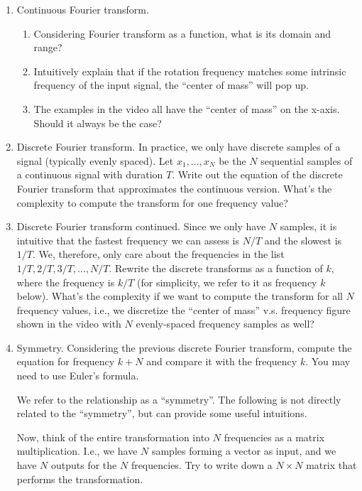 \documentclass[letterpaper, 11pt]{article}
\newcommand{\1}{\mathds{1}}	%
\theoremstyle{definition}
\begin{document}
\begin{enumerate}
    \item Continuous Fourier transform.
    \begin{enumerate}
        \item Considering Fourier transform as a function, what is its domain and range?
        \item Intuitively explain that if the rotation frequency matches some intrinsic frequency of the input signal, the ``center of mass'' will pop up.
        \item The examples in the video all have the ``center of mass'' on the x-axis. Should it always be the case?
    \end{enumerate}

    \item Discrete Fourier transform. In practice, we only have discrete samples of a signal (typically evenly spaced). Let $x_1, \ldots, x_N$ be the $N$ sequential samples of a continuous signal with duration $T$. Write out the equation of the discrete Fourier transform that approximates the continuous version. What's the complexity to compute the transform for one frequency value? 

    \item Discrete Fourier transform continued. Since we only have $N$ samples, it is intuitive that the fastest frequency we can assess is $N/T$ and the slowest is $1/T$. We, therefore, only care about the frequencies in the list $1/T, 2/T, 3/T, \ldots, N/T$. Rewrite the discrete transforms as a function of $k$, where the frequency is $k/T$ (for simplicity, we refer to it as frequency $k$ below).
    What's the complexity if we want to compute the transform for all $N$ frequency values, i.e., we discretize the ``center of mass'' v.s. frequency figure shown in the video with $N$ evenly-spaced frequency samples as well?

    \item Symmetry. Considering the previous discrete Fourier transform, compute the equation for frequency $k+N$ and compare it with the frequency $k$. You may need to use Euler's formula. 
    
    We refer to the relationship as a ``symmetry''. The following is not directly related to the ``symmetry'', but can provide some useful intuitions. 
    
    Now, think of the entire transformation into $N$ frequencies as a matrix multiplication. I.e., we have  $N$ samples forming a vector as input, and we have $N$ outputs for the $N$ frequencies. Try to write down a $N \times N$ matrix that performs the transformation.


\end{enumerate}
\end{document}
